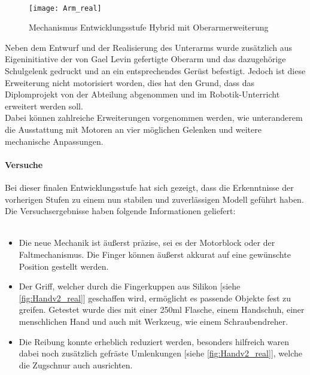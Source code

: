 \documentclass[titlepage,12pt,twoside]{article}
\begin{document}
\\
\begin{figure}[H]
	\begin{center}
		\scalebox{1}
		{\texttt{[image: Arm\_real]}}
		\caption{Mechanismus Entwicklungsstufe Hybrid mit Oberarmerweiterung}
		\label{fig:Arm_real}			
	\end{center}
\end{figure}
\hfill \break
Neben dem Entwurf und der Realisierung des Unterarms wurde zusätzlich aus 
Eigeninitiative der von Gael Levin gefertigte Oberarm und das dazugehörige 
Schulgelenk gedruckt und an ein entsprechendes Gerüst befestigt. Jedoch ist diese 
Erweiterung nicht motorisiert worden, dies hat den Grund, dass das Diplomprojekt
von der Abteilung abgenommen und im Robotik-Unterricht erweitert werden soll. \\
Dabei können zahlreiche Erweiterungen vorgenommen werden, wie unteranderem die 
Ausstattung mit Motoren an vier möglichen Gelenken und weitere mechanische 
Anpassungen. \\
\paragraph{Versuche}
\hfill \break
\hfill \break
Bei dieser finalen Entwicklungsstufe hat sich gezeigt, dass die Erkenntnisse der 
vorherigen Stufen zu einem nun stabilen und zuverlässigen Modell geführt haben. 
Die Versuchsergebnisse haben folgende Informationen geliefert: \\
\\
\begin{itemize}
	\item Die neue Mechanik ist äußerst präzise, sei es der Motorblock oder der 
	Faltmechanismus. Die Finger können äußerst akkurat auf eine gewünschte 
	Position gestellt werden.
	\item Der Griff, welcher durch die Fingerkuppen aus Silikon [siehe \textcolor{blue}{\autoref{fig:Handv2_real}}] geschaffen wird, 
	ermöglicht es passende Objekte fest zu greifen. Getestet wurde dies mit einer 
	250ml Flasche, einem Handschuh, einer menschlichen Hand und auch mit Werkzeug, 
	wie einem Schraubendreher. 
	\item Die Reibung konnte erheblich reduziert werden, besonders hilfreich waren 
	dabei noch zusätzlich gefräste Umlenkungen [siehe \textcolor{blue}{\autoref{fig:Handv2_real}}], welche die Zugschnur auch 
	ausrichten. 
\end{itemize}
\end{document}
